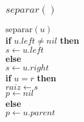 \documentclass{beamer}
\begin{document}
\begin{frame}[shrink]
\frametitle{$separar()$}
\begin{oframed}
\begin{flushleft}
\hspace*{1em} \ensuremath{\mathrm{separar}(\ensuremath{\mathit{u}})}\\
\hspace*{1em} \hspace*{1em} {\color{black} \textbf{if}} \ensuremath{\ensuremath{\mathit{u}}.\ensuremath{\mathit{left}} \ne nil} {\color{black} \textbf{then}} \\
\hspace*{1em} \hspace*{1em} \hspace*{1em} \ensuremath{\ensuremath{\mathit{s}} \gets  \ensuremath{\ensuremath{\mathit{u}}.left}}\\
\hspace*{1em} \hspace*{1em} {\color{black} \textbf{else}} \\
\hspace*{1em} \hspace*{1em} \hspace*{1em} \ensuremath{\ensuremath{\mathit{s}} \gets  \ensuremath{\ensuremath{\mathit{u}}.right}}\\
\hspace*{1em} \hspace*{1em} {\color{black} \textbf{if}} \ensuremath{\ensuremath{\mathit{u}} = r} {\color{black} \textbf{then}} \\
\hspace*{1em} \hspace*{1em} \hspace*{1em} \ensuremath{\ensuremath{\mathit{raiz}} \gets  \ensuremath{s}}\\
\hspace*{1em} \hspace*{1em} \hspace*{1em} \ensuremath{\ensuremath{\mathit{p}} \gets  \ensuremath{nil}}\\
\hspace*{1em} \hspace*{1em} {\color{black} \textbf{else}} \\
\hspace*{1em} \hspace*{1em} \hspace*{1em} \ensuremath{\ensuremath{\mathit{p}} \gets  \ensuremath{\ensuremath{\mathit{u}}.parent}}\\

\end{flushleft}
\end{oframed}
\end{frame}
\end{document}
